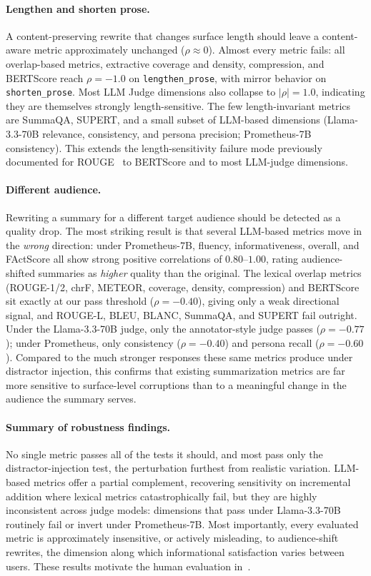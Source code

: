 \paragraph{Lengthen and shorten prose.} A content-preserving rewrite that changes surface length should leave a content-aware metric approximately unchanged ($\rho \approx 0$). Almost every metric fails: all overlap-based metrics, extractive coverage and density, compression, and BERTScore reach $\rho = -1.0$ on \texttt{lengthen\_prose}, with mirror behavior on \texttt{shorten\_prose}. Most LLM Judge dimensions also collapse to $|\rho| = 1.0$, indicating they are themselves strongly length-sensitive. The few length-invariant metrics are SummaQA, SUPERT, and a small subset of LLM-based dimensions (Llama-3.3-70B relevance, consistency, and persona precision; Prometheus-7B consistency). This extends the length-sensitivity failure mode previously documented for ROUGE~\cite{sun2019compare} to BERTScore and to most LLM-judge dimensions.

\paragraph{Different audience.} Rewriting a summary for a different target audience should be detected as a quality drop. The most striking result is that several LLM-based metrics move in the \emph{wrong} direction: under Prometheus-7B, fluency, informativeness, overall, and FActScore all show strong positive correlations of $0.80$--$1.00$, rating audience-shifted summaries as \emph{higher} quality than the original. The lexical overlap metrics (ROUGE-1/2, chrF, METEOR, coverage, density, compression) and BERTScore sit exactly at our pass threshold ($\rho = -0.40$), giving only a weak directional signal, and ROUGE-L, BLEU, BLANC, SummaQA, and SUPERT fail outright. Under the Llama-3.3-70B judge, only the annotator-style judge passes ($\rho = -0.77$); under Prometheus, only consistency ($\rho = -0.40$) and persona recall ($\rho = -0.60$). Compared to the much stronger responses these same metrics produce under distractor injection, this confirms that existing summarization metrics are far more sensitive to surface-level corruptions than to a meaningful change in the audience the summary serves.

\paragraph{Summary of robustness findings.} No single metric passes all of the tests it should, and most pass only the distractor-injection test, the perturbation furthest from realistic variation. LLM-based metrics offer a partial complement, recovering sensitivity on incremental addition where lexical metrics catastrophically fail, but they are highly inconsistent across judge models: dimensions that pass under Llama-3.3-70B routinely fail or invert under Prometheus-7B. Most importantly, every evaluated metric is approximately insensitive, or actively misleading, to audience-shift rewrites, the dimension along which informational satisfaction varies between users. These results motivate the human evaluation in~.

